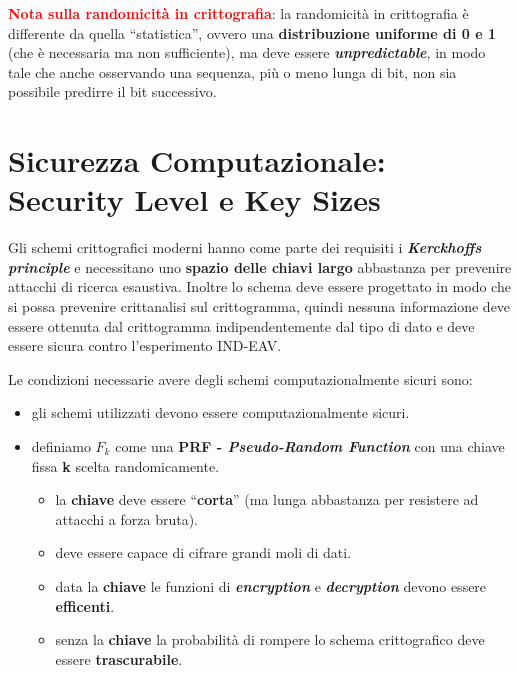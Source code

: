 \begin{flushleft}
    \textcolor{red}{\textbf{Nota sulla randomicità in crittografia}}: la randomicità in crittografia è differente da quella ``statistica'', ovvero una \textbf{distribuzione uniforme di 0 e 1} (che è necessaria ma non sufficiente), ma deve essere \textbf{\textit{unpredictable}}, in modo tale che anche osservando una sequenza, più o meno lunga di bit, non sia possibile predirre il bit successivo.
\end{flushleft}

\section{Sicurezza Computazionale: Security Level e Key Sizes}
Gli schemi crittografici moderni hanno come parte dei requisiti i \textbf{\textit{Kerckhoffs principle}} e necessitano uno \textbf{spazio delle chiavi largo} abbastanza per prevenire attacchi di ricerca esaustiva. Inoltre lo schema deve essere progettato in modo che si possa prevenire crittanalisi sul crittogramma, quindi nessuna informazione deve essere ottenuta dal crittogramma indipendentemente dal tipo di dato e deve essere sicura contro l'esperimento IND-EAV. 

Le condizioni necessarie avere degli schemi computazionalmente sicuri sono:
\begin{itemize}[nosep]
    \item gli schemi utilizzati devono essere computazionalmente sicuri.
    \item definiamo $F_k$ come una \textbf{PRF - \textit{Pseudo-Random Function}} con una chiave fissa \textbf{k} scelta randomicamente.
    \begin{itemize}[nosep]
        \item la \textbf{chiave} deve essere ``\textbf{corta}'' (ma lunga abbastanza per resistere ad attacchi a forza bruta).
        \item deve essere capace di cifrare grandi moli di dati.
        \item data la \textbf{chiave} le funzioni di \textbf{\textit{encryption}} e \textbf{\textit{decryption}} devono essere \textbf{efficenti}.
        \item senza la \textbf{chiave} la probabilità di rompere lo schema crittografico deve essere \textbf{trascurabile}.
    \end{itemize}
\end{itemize}

